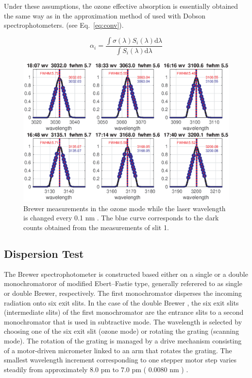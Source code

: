 \documentclass[acp, manuscript]{copernicus}
\begin{document}
Under these assumptions, the ozone effective absorption is essentially obtained the same way as in the approximation method of \citet{Bernhard2005} used with Dobson spectrophotometers. (see Eq.~\ref{eq:conv}).


      \begin{equation}
      \label{eq:conv}
            \alpha_i = \frac{\int \sigma(\lambda) S_i(\lambda) \mbox{d}\lambda}{\int S_i(\lambda) \mbox{d}\lambda}
      \end{equation}

%

\begin{figure}[t]
\includegraphics[width=12cm]{figures/General_Laser_scan_dsp.eps}
\caption{Brewer measurements in the ozone mode while the laser wavelength is changed every 0.1 nm . The blue curve corresponds to the dark counts obtained from the measurements of slit 1.}
\label{fig:laser_dsp}
\end{figure}
\subsection{Dispersion Test}

The Brewer spectrophotometer is constructed based either on a single or a double monochromatoror of modified Ebert–Fastie type, generally referered to as single or double Brewer, respectively. The first monochromator disperses the incoming radiation onto six exit slits. In the case of the double Brewer , the six exit slits  (intermediate slits) of the first monochromator are the entrance slits to a second monochromator that is used in subtractive mode. The wavelength is selected by choosing one of the six exit slit (ozone mode) or rotating the grating (scanning mode). The rotation of the grating is managed by a drive mechanism consisting of a motor-driven micrometer linked to an arm that rotates the grating. The smallest wavelength increment corresponding to one stepper motor step varies steadily from approximately 8.0 pm to 7.0 pm ( 0.0080 \unit{nm} ) \citet{Grobner1998}. 
\end{document}
